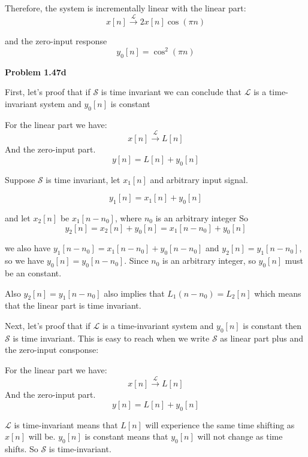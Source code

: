 \documentclass[koma,a4paper,utopia,12pt,listings-color,microtype,paralist,colorlinks,urlcolor=red]{org-article}
\begin{document}
Therefore, the system is incrementally linear with the linear part:
\begin{equation*}
x[n] \xrightarrow{\mathcal{L}} 2x[n]\cos(\pi n)
\end{equation*}

and the zero-input response
\begin{equation*}
y_{0}[n] = \cos^{2}(\pi n)
\end{equation*}

\textbf{Problem 1.47d}

First, let's proof that if \(\mathcal{S}\) is time invariant we can conclude
that \(\mathcal{L}\) is a time-invariant system and \(y_{0}[n]\) is constant

For the linear part we have:
\begin{equation*}
x[n] \xrightarrow{\mathcal{L}} L[n]
\end{equation*}
And the zero-input part.
\begin{equation*}
y[n] = L[n] + y_{0}[n]
\end{equation*}

Suppose \(\mathcal{S}\) is time invariant, let \(x_{1}[n]\) and arbitrary input signal.

\begin{equation*}
y_{1}[n] = x_{1}[n] + y_{0}[n]
\end{equation*}

and let \(x_{2}[n]\) be \(x_{1}[n-n_{0}]\), where \(n_{0}\) is an arbitrary integer So
\begin{equation*}
y_{2}[n] = x_{2}[n] + y_{0}[n] = x_{1}[n-n_{0}] + y_{0}[n]
\end{equation*}

we also have \(y_{1}[n-n_{0}] = x_{1}[n-n_{0}] + y_{0}[n-n_{0}]\) and \(y_{2}[n]
= y_{1}[n-n_{0}]\), so we have \(y_{0}[n] = y_{0}[n-n_{0}]\). Since \(n_{0}\) is
an arbitrary integer, so \(y_{0}[n]\) must be an constant.

Also \(y_{2}[n] = y_{1}[n-n_{0}]\) also implies that \(L_{1}(n-n_{0}) =
L_{2}[n]\) which means that the linear part is time invariant.

Next, let's proof that if \(\mathcal{L}\) is a time-invariant system and
\(y_{0}[n]\) is constant then \(\mathcal{S}\) is time invariant. This is easy to
reach when we write \(\mathcal{S}\) as linear part plus and the zero-input
consponse:

For the linear part we have:
\begin{equation*}
x[n] \xrightarrow{\mathcal{L}} L[n]
\end{equation*}
And the zero-input part.
\begin{equation*}
y[n] = L[n] + y_{0}[n]
\end{equation*}

\(\mathcal{L}\) is time-invariant means that \(L[n]\) will experience the same
time shifting as \(x[n]\) will be. \(y_{0}[n]\) is constant means that
\(y_{0}[n]\) will not change as time shifts. So \(\mathcal{S}\) is time-invariant.
\end{document}
